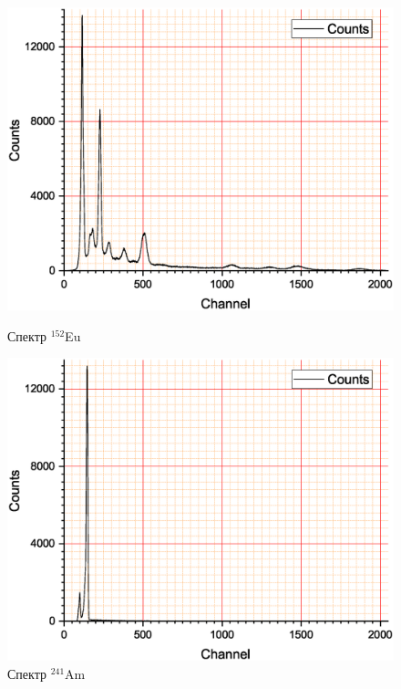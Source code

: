 \documentclass[a4paper]{article}
\begin{document}
\begin{figure}
\begin{center}
\begin{minipage}{0.49\linewidth}
		\end{minipage}
		\begin{minipage}{0.49\linewidth}
			\includegraphics[width=1\linewidth]{eu.eps}
			\caption{Спектр $^{152}$Eu} %
		\end{minipage}
		\hfill 
		\begin{minipage}{0.49\linewidth}
			\includegraphics[width=1\linewidth]{am.eps}
			\caption{Спектр $^{241}$Am}
			\label{ris:xperimcoded}
		\end{minipage}
		\begin{minipage}{0.49\linewidth}

\end{minipage}
\end{center}
\end{figure}
\end{document}
